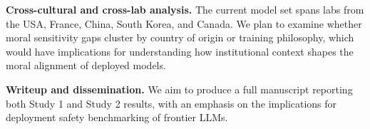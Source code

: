 \documentclass[midterm]{sparreport}
\begin{document}
\textbf{Cross-cultural and cross-lab analysis.} The current model set spans labs from the USA, France, China, South Korea, and Canada. We plan to examine whether moral sensitivity gaps cluster by country of origin or training philosophy, which would have implications for understanding how institutional context shapes the moral alignment of deployed models.

\textbf{Writeup and dissemination.} We aim to produce a full manuscript reporting both Study 1 and Study 2 results, with an emphasis on the implications for deployment safety benchmarking of frontier LLMs.



\end{document}
